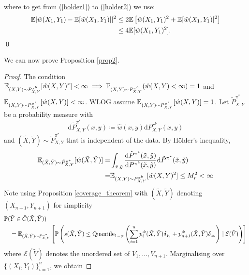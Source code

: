 where to get from (\ref{holder1}) to (\ref{holder2}) we use:
\begin{align}
    \mathbb{E} |\hat{w}(X_1, Y_1) - \mathbb{E}[\hat{w}(X_1, Y_1)] |^2 &\leq 2 \mathbb{E} \left[\hat{w}(X_1, Y_1)^2 + \mathbb{E}[\hat{w}(X_1, Y_1)]^2 \right] \nonumber\\
    &\leq 4\mathbb{E}[\hat{w}(X_1, Y_1)^2]. \nonumber
\end{align}
\qed


We can now prove Proposition \ref{prop2}.
\begin{proof}
The condition $\mathbb{E}_{(X,Y)\sim P^{\pi^b}_{X,Y}}[\hat{w}(X, Y)^r] < \infty \implies \mathbb{P}_{(X,Y)\sim P^{\pi^b}_{X,Y}}(\hat{w}(X, Y)< \infty) = 1$ and $\mathbb{E}_{(X,Y)\sim P^{\pi^b}_{X,Y}}[\hat{w}(X, Y)]<\infty$. WLOG assume $\mathbb{E}_{(X,Y)\sim P^{\pi^b}_{X,Y}}[\hat{w}(X, Y)] = 1$. Let $\tilde{P}^{\pi^*}_{X, Y}$ be a probability measure with 
\[
    \mathrm{d}\tilde{P}^{\pi^*}_{X, Y}(x,y) \coloneqq \hat{w}(x,y) \mathrm{d}P^{\pi^b}_{X, Y}(x,y)
\]
and $(\tilde{X}, \tilde{Y}) \sim \tilde{P}^{\pi^*}_{X,Y}$ that is independent of the data. By H\"older's inequality, 
\begin{align}
    \mathbb{E}_{(\tilde{X},\tilde{Y})\sim \tilde{P}^{\pi^*}_{X,Y}}[\hat{w}(\tilde{X}, \tilde{Y})] =& \int_{\tilde{x}, \tilde{y}} \frac{\mathrm{d}\tilde{P}^{\pi^*}(\tilde{x}, \tilde{y})}{\mathrm{d}P^{\pi^b}(\tilde{x}, \tilde{y})}\mathrm{d}\tilde{P}^{\pi^*}(\tilde{x}, \tilde{y}) \nonumber \\
    =& \mathbb{E}_{(X,Y)\sim P^{\pi^b}_{X,Y}}[\hat{w}(X, Y)^2] \leq M_r^2 < \infty \nonumber 
\end{align}
Note using Proposition \ref{coverage_theorem} with $(\tilde{X}, \tilde{Y})$ denoting $(X_{n+1}, Y_{n+1})$ for simplicity 
\begin{align}
    &\mathbb{P}(\tilde{Y} \in \hat{C}(\tilde{X}, \tilde{Y})) \nonumber \\
    &\quad= \mathbb{E}_{(\tilde{X},\tilde{Y})\sim P^{\pi^*}_{X,Y}} \left[\mathbb{P}\left(s(\tilde{X}, \tilde{Y}) \leq \text{Quantile}_{1-\alpha}\left(\sum_{i=1}^n p_i^{\hat{w}}(\tilde{X}, \tilde{Y})\delta_{V_i} + p_{n+1}^{\hat{w}}(\tilde{X}, \tilde{Y})\delta_\infty \right)\mid \mathcal{E}(\tilde{V})\right)\right] \label{eq4}
\end{align}
where $\mathcal{E}(\tilde{V})$ denotes the unordered set of $V_1, \dots, V_{n+1}$. Marginalising over $\{(X_i, Y_i)\}_{i=1}^n$, we obtain

\end{proof}
